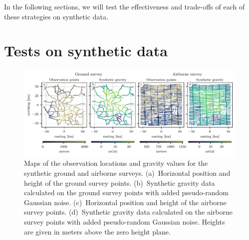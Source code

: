 In the following sections, we will test the effectiveness and trade-offs of
each of these strategies on synthetic data.


\section{Tests on synthetic data}

\begin{figure}
    \includegraphics[width=\linewidth]{figs/synthetic-survey-layouts.pdf}
    \caption{
        Maps of the observation locations and gravity values for the synthetic
        ground and airborne surveys.
        (a)~Horizontal position and height of the ground survey points.
        (b)~Synthetic gravity data calculated on the ground survey points with
        added pseudo-random Gaussian noise.
        (c)~Horizontal position and height of the airborne survey points.
        (d)~Synthetic gravity data calculated on the airborne survey points
        with added pseudo-random Gaussian noise.
        Heights are given in meters above the zero height plane.
    }
    \label{fig:synthetic-layouts}
\end{figure}

